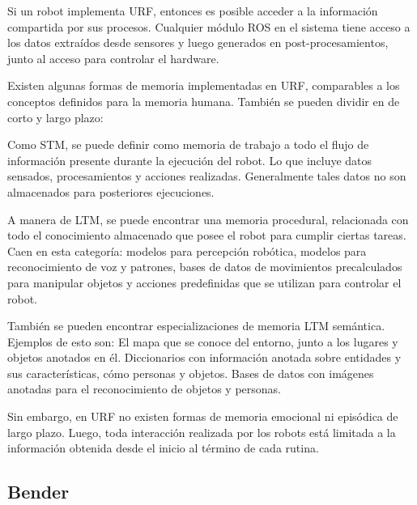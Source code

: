 
Si un robot implementa URF, entonces es posible acceder a la información compartida por sus procesos. Cualquier módulo ROS en el sistema tiene acceso a los datos extraídos desde sensores y luego generados en post-procesamientos, junto al acceso para controlar el hardware.

Existen algunas formas de memoria implementadas en URF, comparables a los conceptos definidos para la memoria humana. También se pueden dividir en de corto y largo plazo:

Como STM, se puede definir como memoria de trabajo a todo el flujo de información presente durante la ejecución del robot. Lo que incluye datos sensados, procesamientos y acciones realizadas. Generalmente tales datos no son almacenados para posteriores ejecuciones.

A manera de LTM, se puede encontrar una memoria procedural, relacionada con todo el conocimiento almacenado que posee el robot para cumplir ciertas tareas. Caen en esta categoría: modelos para percepción robótica, modelos para reconocimiento de voz y patrones, bases de datos de movimientos precalculados para manipular objetos y acciones predefinidas que se utilizan para controlar el robot.

También se pueden encontrar especializaciones de memoria LTM semántica. Ejemplos de esto son: El mapa que se conoce del entorno, junto a los lugares y objetos anotados en él. Diccionarios con información anotada sobre entidades y sus características, cómo personas y objetos. Bases de datos con imágenes anotadas para el reconocimiento de objetos y personas. 

Sin embargo, en URF no existen formas de memoria emocional ni episódica de largo plazo. Luego, toda interacción realizada por los robots está limitada a la información obtenida desde el inicio al término de cada rutina.



\subsection{Bender}

